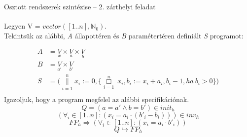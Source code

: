 \documentclass{article}
\begin{document}
Osztott rendszerek szintézise -- 2. zárthelyi feladat\\\\
Legyen V = $vector([1..n], \mathbb{N}_0)$.\\
Tekintsük az alábbi, \textit{A} állapottéren és \textit{B} paramétertéren definiált \textit{S} programot:

\begin{align*}
A &= \underset{x}{V} \times \underset{a}{V} \times \underset{b}{V}\\
B &= \underset{a'}{V} \times \underset{b'}{V}\\
S &=  \bigg(\overset{n}{\underset{i=1}{\parallel}} x_i := 0, \bigg\lbrace \overset{n}{\underset{i=1}{\Box}}\ x_i, b_i := x_i+a_i, b_i-1, ha\ b_i > 0 \bigg\rbrace\bigg)\\
\end{align*}
Igazoljuk, hogy a program megfelel az alábbi specifikációnak.
\begin{equation}\tag{-}
Q = (a=a' \land b=b') \in init_h
\end{equation}
\begin{equation}\tag{6 pont}
(\forall_i \in [1..n]: (x_i = a_i \cdot (b'_i-b_i))) \in inv_h
\end{equation}
\begin{equation}\tag{6 pont}
FP_h \Rightarrow (\forall_i \in [1..n] : (x_i = a_i \cdot b'_i))
\end{equation}
\begin{equation}\tag{8 pont}
Q \hookrightarrow FP_h
\end{equation}
\end{document}
